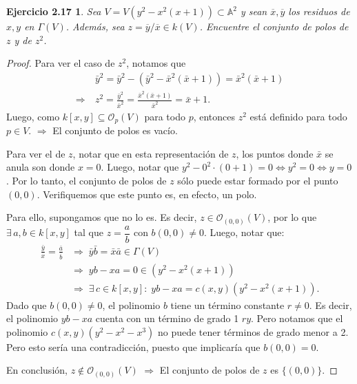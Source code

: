 \documentclass[12pt,a4paper]{article}
\theoremstyle{plain}
\newtheorem*{ejercicio4}{Ejercicio 2.17}
\newcommand{\OO}{\mathcal{O}}
\begin{document}

\begin{ejercicio4}
	Sea $V = V(y^{2} - x^{2}(x + 1)) \subset \mathbb{A}^{2}$ y sean $\overline{x}, \overline{y}$ los residuos de $x,y$ en $\Gamma(V)$. Además, sea $z = \overline{y} \slash \overline{x} \in k(V)$. Encuentre el conjunto de polos de $z$ y de $z^{2}$.
\end{ejercicio4}

\begin{proof}
	Para ver el caso de $z^2$, notamos que
	\begin{align*}
		& \bar{y}^2 = \bar{y}^2 - (\bar{y}^2-\bar{x}^2(\bar{x}+1)) = \bar{x}^2(\bar{x}+1) \\
		\Rightarrow \ & z^2 = \frac{\bar{y}^2}{\bar{x}^2} = \frac{\bar{x}^2(\bar{x}+1)}{\bar{x}^2} = \bar{x}+1.
	\end{align*}
	Luego, como $k[x,y]\subseteq\OO_p(V)$ para todo $p$, entonces $z^2$ está definido para todo $p\in V$. $\Rightarrow$ El conjunto de polos es vacío.

	Para ver el de $z$, notar que en esta representación de $z$, los puntos donde $\bar{x}$ se anula son donde $x=0$. Luego, notar que $y^2-0^2\cdot(0+1)=0\iff y^2=0\iff y=0$. Por lo tanto, el conjunto de polos de $z$ sólo puede estar formado por el punto $(0,0)$. Verifiquemos que este punto es, en efecto, un polo.

	Para ello, supongamos que no lo es. Es decir, $z\in\OO_{(0,0)}(V)$, por lo que $\exists\,a,b\in k[x,y]$ tal que $z=\dfrac{a}{b}$ con $b(0,0)\neq 0$. Luego, notar que:
	\begin{align*}
		\frac{\bar{y}}{\bar{x}} = \frac{\bar{a}}{\bar{b}} &\Rightarrow\; \bar{y}\bar{b}=\bar{x}\bar{a}\in\Gamma(V) \\
		&\Rightarrow\; yb-xa=0\in(y^2-x^2(x+1)) \\
		&\Rightarrow\; \exists\,c\in k[x,y]:\; yb-xa=c(x,y)(y^2-x^2(x+1)).
	\end{align*}
	Dado que $b(0,0)\neq 0$, el polinomio $b$ tiene un término constante $r\neq 0$. Es decir, el polinomio $yb-xa$ cuenta con un término de grado 1 $ry$. Pero notamos que el polinomio $c(x,y)(y^2-x^2-x^3)$ no puede tener términos de grado menor a 2. Pero esto sería una contradicción, puesto que implicaría que $b(0,0)=0$.

	En conclusión, $z\notin\OO_{(0,0)}(V)$ $\Rightarrow$ El conjunto de polos de $z$ es $\{(0,0)\}$.
\end{proof}
\end{document}
